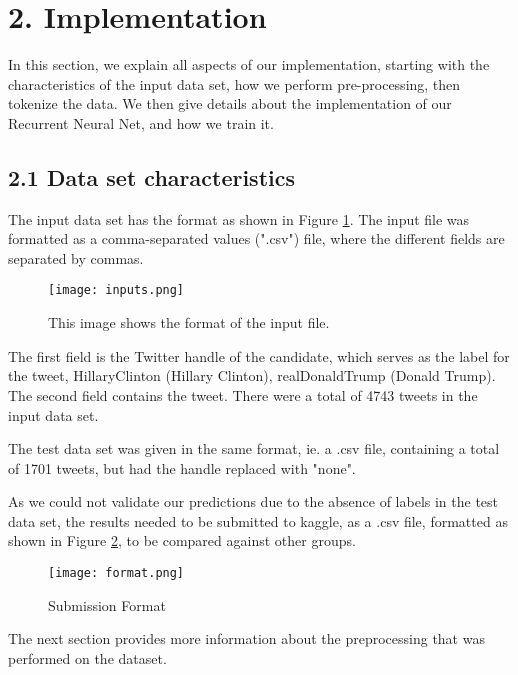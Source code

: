
\section*{2. Implementation}


In this section, we explain all aspects of our implementation, starting with the characteristics of the input data set, how we perform pre-processing, then tokenize the data. We then give details about the implementation of our Recurrent Neural Net, and how we train it.

\subsection*{2.1 Data set characteristics}

The input data set has the format as shown in Figure \ref{input}. The input file was formatted as a comma-separated values (".csv") file, where the different fields are separated by commas. 

\begin{figure}[h]
\centering
\texttt{[image: inputs.png]}
\caption{This image shows the format of the input file.} \label{input}
\end{figure}

The first field is the Twitter handle of the candidate, which serves as the label for the tweet, HillaryClinton (Hillary Clinton), realDonaldTrump (Donald Trump). The second field contains the tweet. There were a total of 4743 tweets in the input data set.

The test data set was given in the same format, ie. a .csv file, containing a total of 1701 tweets, but had the handle replaced with "none". 

	As we could not validate our predictions due to the absence of labels in the test data set, the results needed to be submitted to kaggle, as a .csv file, formatted as shown in Figure \ref{format}, to be compared against other groups.

\begin{figure}[h]
\centering
\texttt{[image: format.png]}
\caption{Submission Format} \label{format}
\end{figure}	

The next section provides more information about the preprocessing that was performed on the dataset. 

